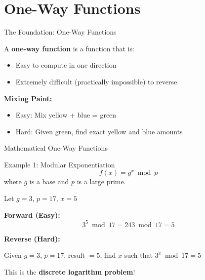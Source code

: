 \documentclass{beamer}
\begin{document}
\section{One-Way Functions}

\begin{frame}{The Foundation: One-Way Functions}
\begin{definition}
A \textbf{one-way function} is a function that is:
\begin{itemize}
    \item Easy to compute in one direction
    \item Extremely difficult (practically impossible) to reverse
\end{itemize}
\end{definition}

\pause

\begin{example}
\textbf{Mixing Paint:}
\begin{itemize}
    \item \textcolor{green!60!black}{Easy:} Mix yellow + blue = green
    \item \textcolor{red!60!black}{Hard:} Given green, find exact yellow and blue amounts
\end{itemize}
\end{example}
\end{frame}

\begin{frame}{Mathematical One-Way Functions}
\begin{block}{Example 1: Modular Exponentiation}
\[
f(x) = g^x \bmod p
\]
where $g$ is a base and $p$ is a large prime.
\end{block}

\pause

\begin{example}
Let $g = 3$, $p = 17$, $x = 5$

\textbf{Forward (Easy):}
\[
3^5 \bmod 17 = 243 \bmod 17 = 5
\]

\pause

\textbf{Reverse (Hard):}

Given $g = 3$, $p = 17$, result $= 5$, find $x$ such that $3^x \bmod 17 = 5$

This is the \textbf{discrete logarithm problem}!
\end{example}
\end{frame}
\end{document}
